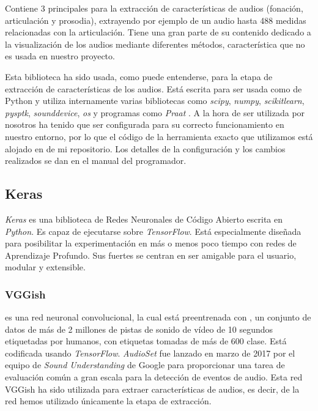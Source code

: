 Contiene 3  principales para la extracción de características de audios (fonación, articulación y prosodia), extrayendo por ejemplo de un audio hasta 488 medidas relacionadas con la articulación. Tiene una gran parte de su contenido dedicado a la visualización de los audios mediante diferentes métodos, característica que no es usada en nuestro proyecto. 

Esta biblioteca ha sido usada, como puede entenderse, para la etapa de extracción de características de los audios. Está escrita para ser usada como  de Python y utiliza internamente varias bibliotecas como \textit{scipy}, \textit{numpy}, \textit{scikitlearn}, \textit{pysptk}, \textit{sounddevice}, \textit{os} y programas como \textit{Praat} \cite{praat}. A la hora de ser utilizada por nosotros ha tenido que ser configurada para su correcto funcionamiento en nuestro entorno, por lo que el código de la herramienta exacto que utilizamos está alojado en  de mi repositorio. Los detalles de la configuración y los cambios realizados se dan en el manual del programador.


\subsection{Keras}
\textit{Keras} \cite{wiki:keras} es una biblioteca de Redes Neuronales de Código Abierto escrita en \textit{Python}. Es capaz de ejecutarse sobre \textit{TensorFlow}. Está especialmente diseñada para posibilitar la experimentación en más o menos poco tiempo con redes de Aprendizaje Profundo. Sus fuertes se centran en ser amigable para el usuario, modular y extensible.

\subsubsection{VGGish} \label{subsec:vggish}
 \cite{vggish} es una red neuronal convolucional, la cual está preentrenada con  \cite{audioset}, un conjunto de datos de más de 2 millones de pistas de sonido de vídeo de 10 segundos etiquetadas por humanos, con etiquetas tomadas de más de 600 clase. Está codificada usando \textit{TensorFlow}. \textit{AudioSet} fue lanzado en marzo de 2017 por el equipo de \textit{Sound Understanding} de Google para proporcionar una tarea de evaluación común a gran escala para la detección de eventos de audio. Esta red VGGish ha sido utilizada para extraer características de audios, es decir, de la red hemos utilizado únicamente la etapa de extracción.

